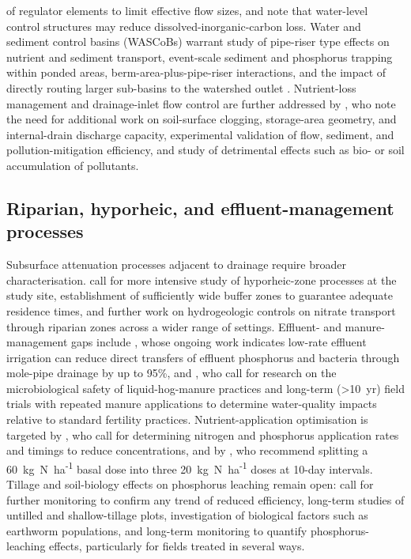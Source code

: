 of regulator elements to limit effective flow sizes, and \textcite{Schilling2023} note that water-level control structures may reduce dissolved-inorganic-carbon loss. Water and sediment control basins (WASCoBs) warrant study of pipe-riser type effects on nutrient and sediment transport, event-scale sediment and phosphorus trapping within ponded areas, berm-area-plus-pipe-riser interactions, and the impact of directly routing larger sub-basins to the watershed outlet \parencite{Gupta2019}. Nutrient-loss management and drainage-inlet flow control are further addressed by \textcite{Nédélec2010}, who note the need for additional work on soil-surface clogging, storage-area geometry, and internal-drain discharge capacity, experimental validation of flow, sediment, and pollution-mitigation efficiency, and study of detrimental effects such as bio- or soil accumulation of pollutants.

\subsection{Riparian, hyporheic, and effluent-management processes}
Subsurface attenuation processes adjacent to drainage require broader characterisation. \textcite{Puckett2005} call for more intensive study of hyporheic-zone processes at the study site, establishment of sufficiently wide buffer zones to guarantee adequate residence times, and further work on hydrogeologic controls on nitrate transport through riparian zones across a wider range of settings. Effluent- and manure-management gaps include \textcite{Monaghan2007}, whose ongoing work indicates low-rate effluent irrigation can reduce direct transfers of effluent phosphorus and bacteria through mole-pipe drainage by up to 95\%, and \textcite{Gordon2005}, who call for research on the microbiological safety of liquid-hog-manure practices and long-term (>10~yr) field trials with repeated manure applications to determine water-quality impacts relative to standard fertility practices. Nutrient-application optimisation is targeted by \textcite{Farahani2020}, who call for determining nitrogen and phosphorus application rates and timings to reduce concentrations, and by \textcite{Singh2002}, who recommend splitting a 60~kg~N~ha\textsuperscript{-1} basal dose into three 20~kg~N~ha\textsuperscript{-1} doses at 10-day intervals. Tillage and soil-biology effects on phosphorus leaching remain open: \textcite{Ulén2018} call for further monitoring to confirm any trend of reduced efficiency, long-term studies of untilled and shallow-tillage plots, investigation of biological factors such as earthworm populations, and long-term monitoring to quantify phosphorus-leaching effects, particularly for fields treated in several ways.

